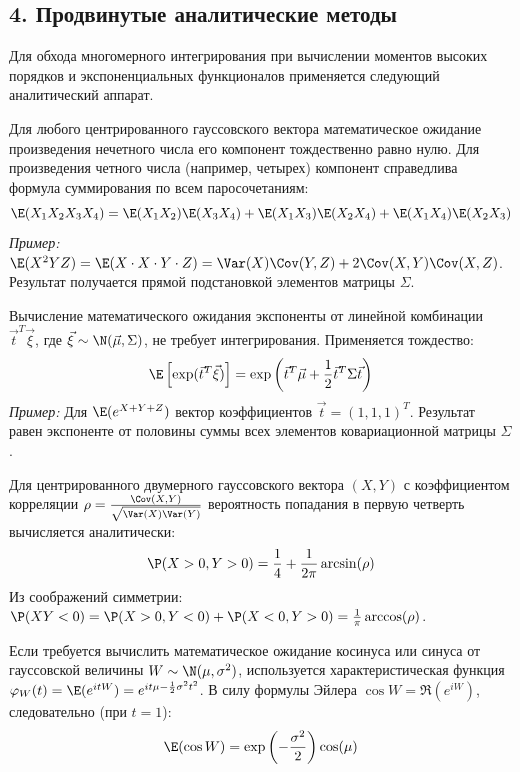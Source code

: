 \subsection*{4. Продвинутые аналитические методы}

Для обхода многомерного интегрирования при вычислении моментов высоких порядков и экспоненциальных функционалов применяется следующий аналитический аппарат.

\begin{HackBox}
Для любого центрированного гауссовского вектора математическое ожидание произведения нечетного числа его компонент тождественно равно нулю. Для произведения четного числа (например, четырех) компонент справедлива формула суммирования по всем паросочетаниям:
\[
    \E(X_1 X_2 X_3 X_4) = \E(X_1X_2)\E(X_3X_4) + \E(X_1X_3)\E(X_2X_4) + \E(X_1X_4)\E(X_2X_3)
\]
\textit{Пример:} $\E(X^2 Y Z) = \E(X \cdot X \cdot Y \cdot Z) = \Var(X)\Cov(Y,Z) + 2\Cov(X,Y)\Cov(X,Z)$. Результат получается прямой подстановкой элементов матрицы $\Sigma$.
\end{HackBox}

\begin{HackBox}
Вычисление математического ожидания экспоненты от линейной комбинации $\vec{t}^T \vec{\xi}$, где $\vec{\xi} \sim \N(\vec{\mu}, \Sigma)$, не требует интегрирования. Применяется тождество:
\[
    \E\left[ \exp(\vec{t}^T \vec{\xi}) \right] = \exp\left( \vec{t}^T \vec{\mu} + \frac{1}{2} \vec{t}^T \Sigma \vec{t} \right)
\]
\textit{Пример:} Для $\E(e^{X+Y+Z})$ вектор коэффициентов $\vec{t} = (1, 1, 1)^T$. Результат равен экспоненте от половины суммы всех элементов ковариационной матрицы $\Sigma$.
\end{HackBox}

\begin{HackBox}
Для центрированного двумерного гауссовского вектора $(X, Y)$ с коэффициентом корреляции $\rho = \frac{\Cov(X,Y)}{\sqrt{\Var(X)\Var(Y)}}$ вероятность попадания в первую четверть вычисляется аналитически:
\[
    \P(X > 0, Y > 0) = \frac{1}{4} + \frac{1}{2\pi}\arcsin(\rho)
\]
Из соображений симметрии: $\P(XY < 0) = \P(X>0, Y<0) + \P(X<0, Y>0) = \frac{1}{\pi}\arccos(\rho)$.
\end{HackBox}

\begin{HackBox}
Если требуется вычислить математическое ожидание косинуса или синуса от гауссовской величины $W \sim \N(\mu, \sigma^2)$, используется характеристическая функция $\varphi_W(t) = \E(e^{itW}) = e^{it\mu - \frac{1}{2}\sigma^2 t^2}$.
В силу формулы Эйлера $\cos W = \Re(e^{iW})$, следовательно (при $t=1$):
\[
    \E(\cos W) = \exp\left(-\frac{\sigma^2}{2}\right) \cos(\mu)
\]
\end{HackBox}

